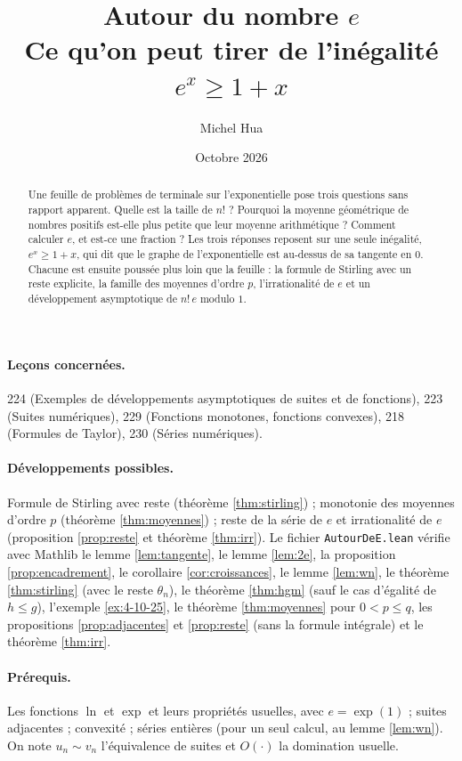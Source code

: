 \documentclass[11pt,a4paper]{article}
\title{Autour du nombre $e$\\[2pt]
\large Ce qu'on peut tirer de l'inégalité $e^x\geq 1+x$}
\author{Michel Hua}
\date{Octobre 2026}
\theoremstyle{plain}
\theoremstyle{definition}
\theoremstyle{remark}
\begin{document}
\maketitle

\begin{abstract}
Une feuille de problèmes de terminale sur l'exponentielle pose trois questions sans rapport apparent. Quelle est la taille de $n!$ ? Pourquoi la moyenne géométrique de nombres positifs est-elle plus petite que leur moyenne arithmétique ? Comment calculer $e$, et est-ce une fraction ? Les trois réponses reposent sur une seule inégalité, $e^x\geq1+x$, qui dit que le graphe de l'exponentielle est au-dessus de sa tangente en $0$. Chacune est ensuite poussée plus loin que la feuille : la formule de Stirling avec un reste explicite, la famille des moyennes d'ordre $p$, l'irrationalité de $e$ et un développement asymptotique de $n!\,e$ modulo $1$.
\end{abstract}

\paragraph{Leçons concernées.} 224 (Exemples de développements asymptotiques de suites et de fonctions), 223 (Suites numériques), 229 (Fonctions monotones, fonctions convexes), 218 (Formules de Taylor), 230 (Séries numériques).

\paragraph{Développements possibles.} Formule de Stirling avec reste (théorème \ref{thm:stirling}) ; monotonie des moyennes d'ordre $p$ (théorème \ref{thm:moyennes}) ; reste de la série de $e$ et irrationalité de $e$ (proposition \ref{prop:reste} et théorème \ref{thm:irr}). Le fichier \texttt{AutourDeE.lean} vérifie avec Mathlib le lemme \ref{lem:tangente}, le lemme \ref{lem:2e}, la proposition \ref{prop:encadrement}, le corollaire \ref{cor:croissances}, le lemme \ref{lem:wn}, le théorème \ref{thm:stirling} (avec le reste $\theta_n$), le théorème \ref{thm:hgm} (sauf le cas d'égalité de $h\leq g$), l'exemple \ref{ex:4-10-25}, le théorème \ref{thm:moyennes} pour $0<p\leq q$, les propositions \ref{prop:adjacentes} et \ref{prop:reste} (sans la formule intégrale) et le théorème \ref{thm:irr}.

\paragraph{Prérequis.} Les fonctions $\ln$ et $\exp$ et leurs propriétés usuelles, avec $e=\exp(1)$ ; suites adjacentes ; convexité ; séries entières (pour un seul calcul, au lemme \ref{lem:wn}). On note $u_n\sim v_n$ l'équivalence de suites et $O(\cdot)$ la domination usuelle.
\end{document}

